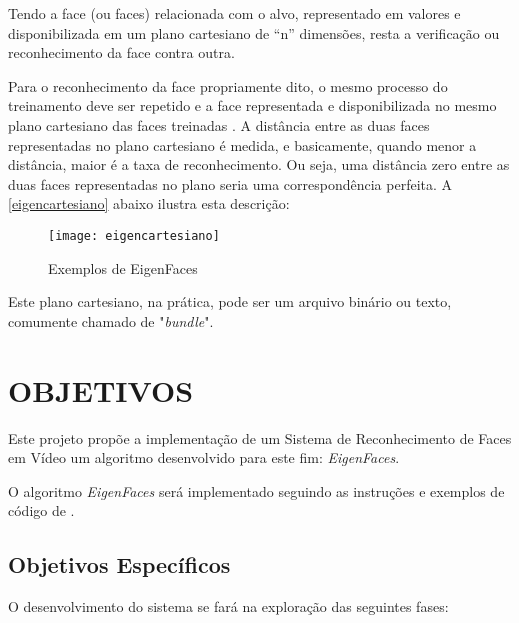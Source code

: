 Tendo a face (ou faces) relacionada com o alvo, representado em valores e disponibilizada em um plano cartesiano de “n” dimensões, resta a verificação ou reconhecimento da face contra outra. 

Para o reconhecimento da face propriamente dito, o mesmo processo do treinamento deve ser repetido e a face representada e disponibilizada no mesmo plano cartesiano das faces treinadas \cite{drmathew_java_programming}. A distância entre as duas faces representadas no plano cartesiano é medida, e basicamente, quando menor a distância, maior é a taxa de reconhecimento. Ou seja, uma distância zero entre as duas faces representadas no plano seria uma correspondência perfeita. A \autoref{eigencartesiano} abaixo ilustra esta descrição:

\begin{figure}[h]
	\centering
	\texttt{[image: eigencartesiano]}
	\caption{Exemplos de EigenFaces}
	\label{eigencartesiano}
\end{figure}

Este plano cartesiano, na prática, pode ser um arquivo binário ou texto, comumente chamado de "\textit{bundle}".

\section{OBJETIVOS}\label{sec:objetivos}
Este projeto propõe a implementação de um Sistema de Reconhecimento de Faces em Vídeo um algoritmo desenvolvido para este fim: \textit{EigenFaces}.

O algoritmo \textit{EigenFaces} será implementado seguindo as instruções e exemplos de código de \cite{drmathew_java_programming}.  

\subsection{Objetivos Específicos}\label{sec:organizacao-trabalho}

O desenvolvimento do sistema se fará na exploração das seguintes fases:

